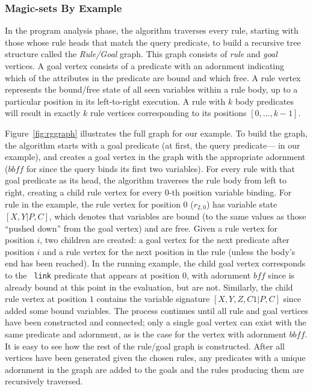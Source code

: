 \subsubsection{Magic-sets By Example}

In the program analysis phase, the algorithm traverses every rule,
starting with those whose rule heads that match the query predicate, to build
a recursive tree structure called the {\em Rule/Goal} graph. This graph
consists of \emph{rule} and \emph{goal} vertices.  A goal
vertex consists of a predicate with an
adornment indicating which of the attributes in the predicate
are bound and which free.  A rule vertex represents the bound/free state of
all seen variables within a rule body, up to a particular position in its
left-to-right execution. A rule with $k$ body predicates will
result in exactly $k$ rule vertices corresponding to its positions
$[0,...,k-1]$.

Figure~\ref{fig:rggraph} illustrates the full graph for our example.  To
build the graph, the algorithm starts with a goal predicate (at first,
the query predicate--- in our example), and creates a goal
vertex in the graph with the appropriate adornment ($\mathit{bbff}$ for
 since the query binds its first two variables). For every
rule with that goal predicate as its head, the algorithm traverses the
rule body from left to right, creating a child rule vertex for every
$0$-th position variable binding.  For rule  in the example, the
rule vertex for position $0$ ($r_{2,0}$) has variable state $[X,Y|P,C]$,
which denotes that variables  are bound (to the same values as
those ``pushed down'' from the goal vertex) and  are free.
Given a rule vertex for position $i$, two children are created: a goal
vertex for the next predicate after position $i$ and a rule vertex for
the next position in the rule (unless the body's end has been reached).
In the running example, the child goal vertex corresponds to the {\tt
link} predicate that appears at position $0$, with adornment
$\mathit{bff}$ since  is already bound at this point in the
evaluation, but  are not.  Similarly, the child rule vertex
at position $1$ contains the variable signature $[X,Y,Z,C1|P,C]$ since
 added some bound variables.  The process continues until all
rule and goal vertices have been constructed and connected; 
only a single goal vertex can exist with the same predicate and
adornment, as is the case for the  vertex with adornment
$\mathit{bbff}$.   It is easy to see how the rest
of the rule/goal graph is constructed. After all vertices have been
generated given the chosen rules, any predicates with a unique adornment
in the graph are added to the goals and the rules producing them are
recursively traversed.


